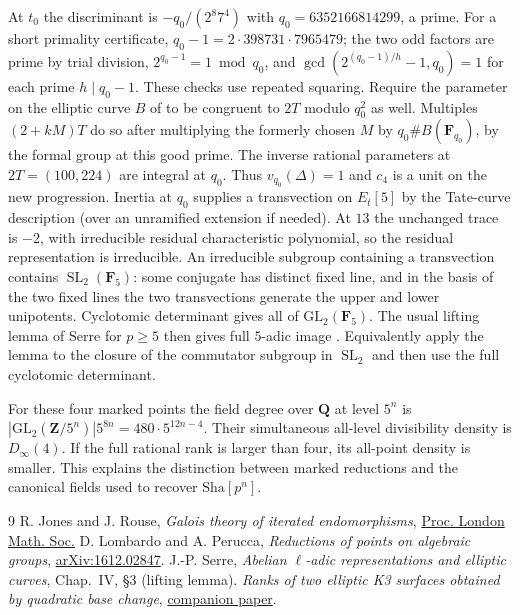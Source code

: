 \documentclass[11pt]{article}
\newcommand{\Q}{\mathbf Q}
\newcommand{\Z}{\mathbf Z}
\newcommand{\F}{\mathbf F}
\newcommand{\Sha}{\mathrm{Sha}}
\newcommand{\GL}{\mathrm{GL}}
\begin{document}
At $t_0$ the discriminant is $-q_0/(2^8 7^4)$ with
$q_0=6352166814299$, a prime. For a short primality certificate,
$q_0-1=2\cdot398731\cdot7965479$; the two odd factors are prime by
trial division, $2^{q_0-1}=1\bmod q_0$, and
$\gcd(2^{(q_0-1)/h}-1,q_0)=1$ for each prime $h\mid q_0-1$.
These checks use repeated squaring. Require the parameter on the
elliptic curve $B$ of \cite{K3} to be congruent to $2T$ modulo $q_0^2$
as well. Multiples $(2+kM)T$ do so after multiplying the formerly
chosen $M$ by $q_0\#B(\F_{q_0})$, by the formal group at this good prime.
The inverse rational parameters at $2T=(100,224)$ are integral at
$q_0$. Thus $v_{q_0}(\Delta)=1$ and $c_4$ is a unit on the new
progression. Inertia at $q_0$ supplies a transvection on $E_t[5]$
by the Tate-curve description (over an unramified extension if needed).
At $13$ the unchanged trace is $-2$, with irreducible residual
characteristic polynomial, so the residual representation is
irreducible. An irreducible subgroup containing a transvection contains
$\operatorname{SL}_2(\F_5)$: some conjugate has distinct fixed line,
and in the basis of the two fixed lines the two transvections generate
the upper and lower unipotents. Cyclotomic determinant gives all of
$\GL_2(\F_5)$. The usual lifting lemma of Serre for $p\ge5$ then
gives full $5$-adic image \cite{Serre}. Equivalently apply the lemma
to the closure of the commutator subgroup in $\operatorname{SL}_2$
and then use the full cyclotomic determinant.

For these four marked points the field degree over $\Q$ at level
$5^n$ is $|\GL_2(\Z/5^n)|5^{8n}=480\cdot5^{12n-4}$.
Their simultaneous all-level divisibility density is $D_\infty(4)$.
If the full rational rank is larger than four, its all-point density
is smaller. This explains the distinction between marked reductions
and the canonical fields used to recover $\Sha[p^n]$.

\begin{thebibliography}{9}
 R. Jones and J. Rouse, \emph{Galois theory of iterated
endomorphisms}, \href{https://doi.org/10.1112/plms/pdp051}{Proc. London Math. Soc.}
 D. Lombardo and A. Perucca, \emph{Reductions of points
on algebraic groups}, \href{https://arxiv.org/abs/1612.02847}{arXiv:1612.02847}.
 J.-P. Serre, \emph{Abelian $\ell$-adic representations and
elliptic curves}, Chap.~IV, \S3 (lifting lemma).
 \emph{Ranks of two elliptic K3 surfaces obtained by quadratic
base change}, \href{https://github.com/cosmosgeek0/BSD/blob/main/quadratic-base-change-k3.pdf}{companion paper}.
\end{thebibliography}
\end{document}
